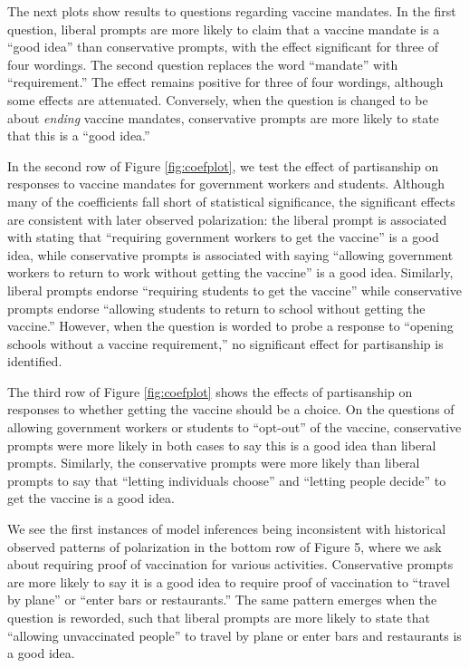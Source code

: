 \documentclass{article} %
\begin{document}
The next plots show results to questions regarding vaccine mandates. In
the first question, liberal prompts are more likely to claim that a
vaccine mandate is a ``good idea'' than conservative prompts, with the
effect significant for three of four wordings. The second question
replaces the word ``mandate'' with ``requirement.'' The effect remains
positive for three of four wordings, although some effects are
attenuated. Conversely, when the question is changed to be about
\emph{ending} vaccine mandates, conservative prompts are more likely to
state that this is a ``good idea.''

In the second row of Figure \ref{fig:coefplot}, we test the effect of partisanship on
responses to vaccine mandates for government workers and students.
Although many of the coefficients fall short of statistical
significance, the significant effects are consistent with later observed
polarization: the liberal prompt is associated with stating that
``requiring government workers to get the vaccine'' is a good idea,
while conservative prompts is associated with saying ``allowing
government workers to return to work without getting the vaccine'' is a
good idea. Similarly, liberal prompts endorse ``requiring students to
get the vaccine'' while conservative prompts endorse ``allowing students
to return to school without getting the vaccine.'' However, when the
question is worded to probe a response to ``opening schools without a
vaccine requirement,'' no significant effect for partisanship is
identified.

The third row of Figure \ref{fig:coefplot} shows the effects of partisanship on responses
to whether getting the vaccine should be a choice. On the questions of
allowing government workers or students to ``opt-out'' of the vaccine,
conservative prompts were more likely in both cases to say this is a
good idea than liberal prompts. Similarly, the conservative prompts were
more likely than liberal prompts to say that ``letting individuals
choose'' and ``letting people decide'' to get the vaccine is a good
idea.

We see the first instances of model inferences being inconsistent with
historical observed patterns of polarization in the bottom row of Figure
5, where we ask about requiring proof of vaccination for various
activities. Conservative prompts are more likely to say it is a good
idea to require proof of vaccination to ``travel by plane'' or ``enter
bars or restaurants.'' The same pattern emerges when the question is
reworded, such that liberal prompts are more likely to state that
``allowing unvaccinated people'' to travel by plane or enter bars and
restaurants is a good idea.
\end{document}
